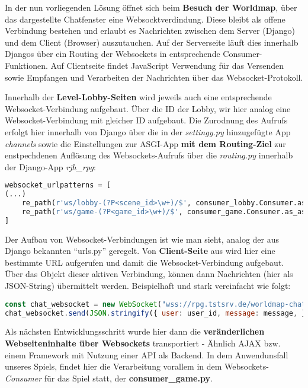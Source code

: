 In der nun vorliegenden Lösung öffnet sich beim \textbf{Besuch der Worldmap}, über das dargestellte Chatfenster eine Websocktverdindung. Diese bleibt als offene Verbindung bestehen und erlaubt es Nachrichten zwischen dem Server (Django) und dem Client (Browser) auszutauchen. Auf der Serverseite läuft dies innerhalb Djangos über ein Routing der Websockets in entsprechende Consumer-Funktionen. Auf Clientseite findet JavaScript Verwendung für das Versenden sowie Empfangen und Verarbeiten der Nachrichten über das Websocket-Protokoll. 

Innerhalb der \textbf{Level-Lobby-Seiten} wird jeweils auch eine entsprechende Websocket-Verbindung aufgebaut. Über die ID der Lobby, wir hier analog eine Websocket-Verbindung mit gleicher ID aufgebaut. Die Zurodnung des Aufrufs erfolgt hier innerhalb von Django über die in der \textit{settingy.py} hinzugefügte App \textit{channels} sowie die Einstellungen zur ASGI-App \textbf{mit dem Routing-Ziel} zur enstpechdenen Auflösung des Websockets-Aufrufs über die \textit{routing.py} innerhalb der Django-App \textit{rjh\_rpg}:

\begin{lstlisting}[language=python]
websocket_urlpatterns = [
(...)
    re_path(r'ws/lobby-(?P<scene_id>\w+)/$', consumer_lobby.Consumer.as_asgi()),
    re_path(r'ws/game-(?P<game_id>\w+)/$', consumer_game.Consumer.as_asgi()),
]
\end{lstlisting}

Der Aufbau von Websocket-Verbindungen ist wie man sieht, analog der aus Django bekannten \enquote{urls.py} geregelt. Von \textbf{Client-Seite} aus wird hier eine bestimmte URL aufgerufen und damit die Websocket-Verbindung aufgebaut. Über das Objekt dieser aktiven Verbindung, können dann Nachrichten (hier als JSON-String) übermittelt werden. Beispielhaft und stark vereinfacht wie folgt: 


\begin{lstlisting}[language=JavaScript]
const chat_websocket = new WebSocket("wss://rpg.tstsrv.de/worldmap-chat/");
chat_websocket.send(JSON.stringify({ user: user_id, message: message, }));
\end{lstlisting}



Als nächsten Entwicklungsschritt wurde hier dann die \textbf{veränderlichen Webseiteninhalte über Websockets} transportiert - Ähnlich AJAX bzw. einem Framework mit Nutzung einer API als Backend. In dem Anwendunsfall unseres Spiels, findet hier die Verarbeitung vorallem in dem Websockets-\textit{Consumer} für das Spiel statt, der \textbf{consumer\_game.py}.

